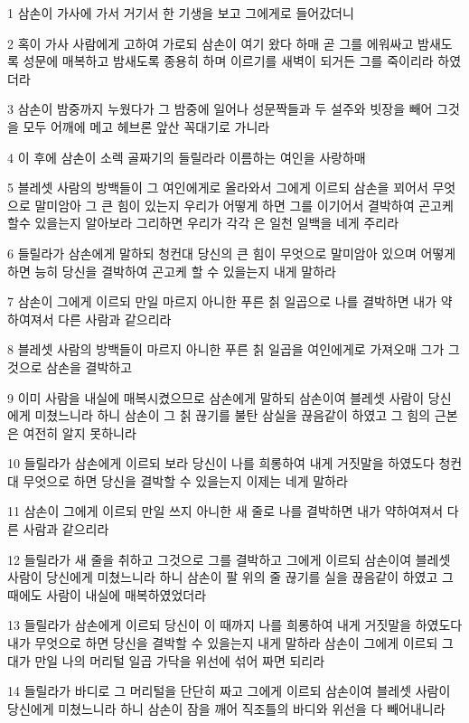\par 1 삼손이 가사에 가서 거기서 한 기생을 보고 그에게로 들어갔더니
\par 2 혹이 가사 사람에게 고하여 가로되 삼손이 여기 왔다 하매 곧 그를 에워싸고 밤새도록 성문에 매복하고 밤새도록 종용히 하며 이르기를 새벽이 되거든 그를 죽이리라 하였더라
\par 3 삼손이 밤중까지 누웠다가 그 밤중에 일어나 성문짝들과 두 설주와 빗장을 빼어 그것을 모두 어깨에 메고 헤브론 앞산 꼭대기로 가니라
\par 4 이 후에 삼손이 소렉 골짜기의 들릴라라 이름하는 여인을 사랑하매
\par 5 블레셋 사람의 방백들이 그 여인에게로 올라와서 그에게 이르되 삼손을 꾀어서 무엇으로 말미암아 그 큰 힘이 있는지 우리가 어떻게 하면 그를 이기어서 결박하여 곤고케 할수 있을는지 알아보라 그리하면 우리가 각각 은 일천 일백을 네게 주리라
\par 6 들릴라가 삼손에게 말하되 청컨대 당신의 큰 힘이 무엇으로 말미암아 있으며 어떻게 하면 능히 당신을 결박하여 곤고케 할 수 있을는지 내게 말하라
\par 7 삼손이 그에게 이르되 만일 마르지 아니한 푸른 칡 일곱으로 나를 결박하면 내가 약하여져서 다른 사람과 같으리라
\par 8 블레셋 사람의 방백들이 마르지 아니한 푸른 칡 일곱을 여인에게로 가져오매 그가 그것으로 삼손을 결박하고
\par 9 이미 사람을 내실에 매복시켰으므로 삼손에게 말하되 삼손이여 블레셋 사람이 당신에게 미쳤느니라 하니 삼손이 그 칡 끊기를 불탄 삼실을 끊음같이 하였고 그 힘의 근본은 여전히 알지 못하니라
\par 10 들릴라가 삼손에게 이르되 보라 당신이 나를 희롱하여 내게 거짓말을 하였도다 청컨대 무엇으로 하면 당신을 결박할 수 있을는지 이제는 네게 말하라
\par 11 삼손이 그에게 이르되 만일 쓰지 아니한 새 줄로 나를 결박하면 내가 약하여져서 다른 사람과 같으리라
\par 12 들릴라가 새 줄을 취하고 그것으로 그를 결박하고 그에게 이르되 삼손이여 블레셋 사람이 당신에게 미쳤느니라 하니 삼손이 팔 위의 줄 끊기를 실을 끊음같이 하였고 그 때에도 사람이 내실에 매복하였었더라
\par 13 들릴라가 삼손에게 이르되 당신이 이 때까지 나를 희롱하여 내게 거짓말을 하였도다 내가 무엇으로 하면 당신을 결박할 수 있을는지 내게 말하라 삼손이 그에게 이르되 그대가 만일 나의 머리털 일곱 가닥을 위선에 섞어 짜면 되리라
\par 14 들릴라가 바디로 그 머리털을 단단히 짜고 그에게 이르되 삼손이여 블레셋 사람이 당신에게 미쳤느니라 하니 삼손이 잠을 깨어 직조틀의 바디와 위선을 다 빼어내니라
